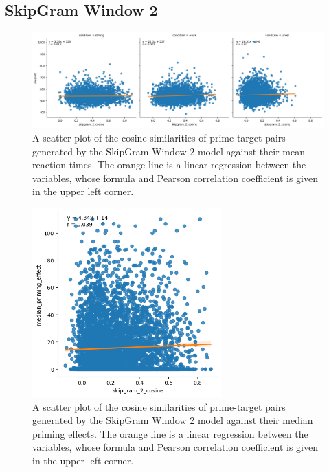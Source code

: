 \documentclass{IEEEtran}
\begin{document}
\subsection*{SkipGram Window 2}
\begin{figure}[h]
    \centering
    \includegraphics[width=\textwidth]{images/skipgram_2_cosine_against_meanrt.png}
    \caption{A scatter plot of the cosine similarities of prime-target pairs generated by the SkipGram Window 2 model against their mean reaction times. The orange line is a linear regression between the variables, whose formula and Pearson correlation coefficient is given in the upper left corner.}
\end{figure}
\begin{figure}[h]
    \centering
    \includegraphics[width=0.65\textwidth]{images/skipgram_2_cosine_against_priming_effect.png}
    \caption{A scatter plot of the cosine similarities of prime-target pairs generated by the SkipGram Window 2 model against their median priming effects. The orange line is a linear regression between the variables, whose formula and Pearson correlation coefficient is given in the upper left corner.}
\end{figure}

\newpage
\end{document}
